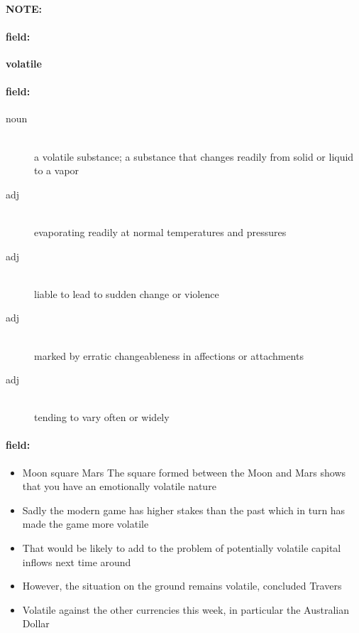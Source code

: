 \documentclass[12pt]{article}
\newenvironment{note}{\paragraph{NOTE:}}{}
\newenvironment{field}{\paragraph{field:}}{}
\begin{document}
\begin{note}
\begin{field}
\textbf{\large volatile}
\end{field}


\begin{field}
\begin{description}
\item[noun] \hfill \\ 
a volatile substance; a substance that changes readily from solid or liquid to a vapor

\item[adj] \hfill \\ 
evaporating readily at normal temperatures and pressures

\item[adj] \hfill \\ 
liable to lead to sudden change or violence

\item[adj] \hfill \\ 
marked by erratic changeableness in affections or attachments

\item[adj] \hfill \\ 
tending to vary often or widely

\end{description}
\end{field}

\begin{field}
\begin{itemize}
\item Moon square Mars The square formed between the Moon and Mars shows that you have an emotionally volatile nature
\item Sadly the modern game has higher stakes than the past which in turn has made the game more volatile
\item That would be likely to add to the problem of potentially volatile capital inflows next time around
\item However, the situation on the ground remains volatile, concluded Travers
\item Volatile against the other currencies this week, in particular the Australian Dollar
\end{itemize}
\end{field}
\end{note}
\end{document}

